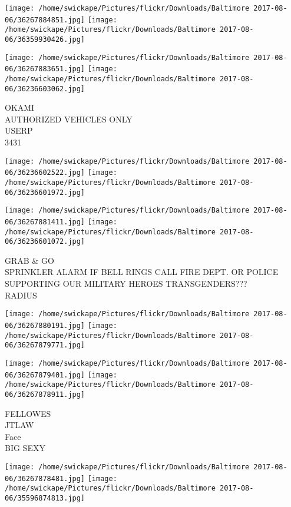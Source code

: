 \documentclass[10pt,letterpaper]{article}
\begin{document}
\texttt{[image: /home/swickape/Pictures/flickr/Downloads/Baltimore 2017-08-06/36267884851.jpg]}
\texttt{[image: /home/swickape/Pictures/flickr/Downloads/Baltimore 2017-08-06/36359930426.jpg]}

\texttt{[image: /home/swickape/Pictures/flickr/Downloads/Baltimore 2017-08-06/36267883651.jpg]}
\texttt{[image: /home/swickape/Pictures/flickr/Downloads/Baltimore 2017-08-06/36236603062.jpg]}

OKAMI\\
AUTHORIZED VEHICLES ONLY\\
USERP\\
3431\\
\pagebreak

\texttt{[image: /home/swickape/Pictures/flickr/Downloads/Baltimore 2017-08-06/36236602522.jpg]}
\texttt{[image: /home/swickape/Pictures/flickr/Downloads/Baltimore 2017-08-06/36236601972.jpg]}

\texttt{[image: /home/swickape/Pictures/flickr/Downloads/Baltimore 2017-08-06/36267881411.jpg]}
\texttt{[image: /home/swickape/Pictures/flickr/Downloads/Baltimore 2017-08-06/36236601072.jpg]}

GRAB \& GO\\
SPRINKLER ALARM IF BELL RINGS CALL FIRE DEPT. OR POLICE\\
SUPPORTING OUR MILITARY HEROES TRANSGENDERS???\\
RADIUS\\
\pagebreak

\texttt{[image: /home/swickape/Pictures/flickr/Downloads/Baltimore 2017-08-06/36267880191.jpg]}
\texttt{[image: /home/swickape/Pictures/flickr/Downloads/Baltimore 2017-08-06/36267879771.jpg]}

\texttt{[image: /home/swickape/Pictures/flickr/Downloads/Baltimore 2017-08-06/36267879401.jpg]}
\texttt{[image: /home/swickape/Pictures/flickr/Downloads/Baltimore 2017-08-06/36267878911.jpg]}

FELLOWES\\
JTLAW\\
Face\\
BIG SEXY\\
\pagebreak

\texttt{[image: /home/swickape/Pictures/flickr/Downloads/Baltimore 2017-08-06/36267878481.jpg]}
\texttt{[image: /home/swickape/Pictures/flickr/Downloads/Baltimore 2017-08-06/35596874813.jpg]}
\end{document}
